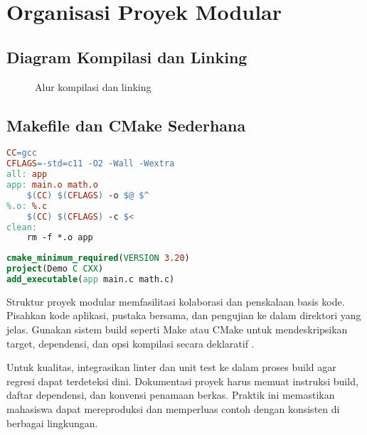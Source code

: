 \documentclass[../main.tex]{subfiles}
\begin{document}
\section{Organisasi Proyek Modular}
\subsection{Diagram Kompilasi dan Linking}
\begin{figure}[h]
  \centering
  \caption{Alur kompilasi dan linking}
\end{figure}

\subsection{Makefile dan CMake Sederhana}
\begin{lstlisting}[language=make, caption={Makefile minimal}]
CC=gcc
CFLAGS=-std=c11 -O2 -Wall -Wextra
all: app
app: main.o math.o
	$(CC) $(CFLAGS) -o $@ $^
%.o: %.c
	$(CC) $(CFLAGS) -c $<
clean:
	rm -f *.o app
\end{lstlisting}

\begin{lstlisting}[language=cmake, caption={CMakeLists.txt minimal}]
cmake_minimum_required(VERSION 3.20)
project(Demo C CXX)
add_executable(app main.c math.c)
\end{lstlisting}
Struktur proyek modular memfasilitasi kolaborasi dan penskalaan basis kode. Pisahkan kode aplikasi, pustaka bersama, dan pengujian ke dalam direktori yang jelas. Gunakan sistem build seperti Make atau CMake untuk mendeskripsikan target, dependensi, dan opsi kompilasi secara deklaratif \parencite{gnu-c-manual,cpp-reference}.

Untuk kualitas, integrasikan linter dan unit test ke dalam proses build agar regresi dapat terdeteksi dini. Dokumentasi proyek harus memuat instruksi build, daftar dependensi, dan konvensi penamaan berkas. Praktik ini memastikan mahasiswa dapat mereproduksi dan memperluas contoh dengan konsisten di berbagai lingkungan.
\end{document}
